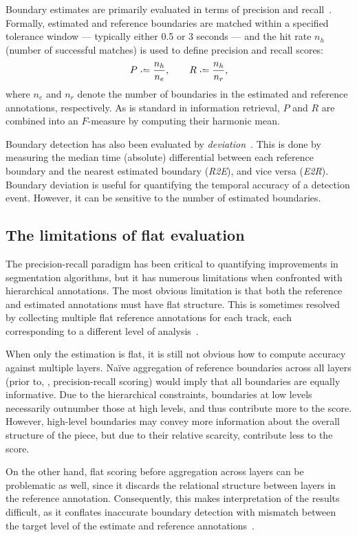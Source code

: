\documentclass{article}
\begin{document}
Boundary estimates are primarily evaluated in terms of precision and recall~\cite{turnbull2007supervised}.
Formally, estimated and reference boundaries are matched within a specified tolerance window --- typically either 0.5 or 3 seconds --- and the hit rate $n_h$ (number of successful matches) is used to define precision and recall scores:
\begin{equation}
P \defeq \frac{n_h}{n_e}, \quad\quad R \defeq \frac{n_h}{n_r},
\end{equation}
where $n_e$ and $n_r$ denote the number of boundaries in the estimated and reference
annotations, respectively.
As is standard in information retrieval, $P$ and $R$ are combined into an $F$-measure by computing their harmonic mean.

Boundary detection has also been evaluated by \emph{deviation}~\cite{turnbull2007supervised}.
This is done by measuring the median time (absolute) differential between each reference boundary and the nearest estimated boundary (\emph{R2E}), and vice versa (\emph{E2R}).
Boundary deviation is useful for quantifying the temporal accuracy of a detection event.
However, it can be sensitive to the number of estimated boundaries.

\subsection{The limitations of flat evaluation}
The precision-recall paradigm has been critical to quantifying improvements in segmentation algorithms, but it has numerous limitations when confronted with hierarchical annotations.
The most obvious limitation is that both the reference and estimated annotations must have flat structure.
This is sometimes resolved by collecting multiple flat reference annotations for each track, 
each corresponding to a different level of analysis~\cite{Smith2011}.

When only the estimation is flat, it is still not obvious how to compute accuracy against multiple layers.
Na\"ive aggregation of reference boundaries across all layers (prior to, \eg, precision-recall scoring) would imply 
that all boundaries are equally informative.
Due to the hierarchical constraints, boundaries at low levels necessarily outnumber those at high levels, and thus contribute more to the score.
However, high-level boundaries may convey more information about the overall structure of the piece, but due
to their relative scarcity, contribute less to the score.

On the other hand, flat scoring before aggregation across layers can be problematic as well, 
since it discards the relational structure between layers in the reference annotation.
Consequently, this makes interpretation of the results difficult, as it conflates
inaccurate boundary detection with mismatch between the target level of the estimate and reference
annotations~\cite{Smith2013}.
\end{document}
